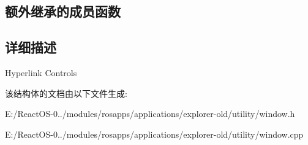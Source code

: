 \subsection*{额外继承的成员函数}


\subsection{详细描述}
Hyperlink Controls 

该结构体的文档由以下文件生成\+:\begin{DoxyCompactItemize}
\item 
E\+:/\+React\+O\+S-\/0../modules/rosapps/applications/explorer-\/old/utility/window.\+h\item 
E\+:/\+React\+O\+S-\/0../modules/rosapps/applications/explorer-\/old/utility/window.\+cpp\end{DoxyCompactItemize}
